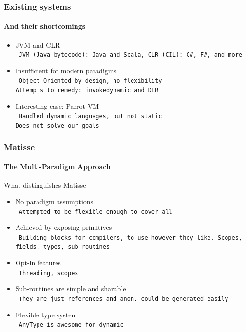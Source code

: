 \documentclass[handout]{beamer}
\newcommand{\n}[1]{\leavevmode\\~\texttt{\color{red}\tiny #1}}
\begin{document}
\begin{frame}
  \frametitle{Existing systems}
  \framesubtitle{And their shortcomings}

  \begin{itemize}
  \item JVM and CLR
    \n{JVM (Java bytecode): Java and Scala, CLR (CIL): C\#, F\#, and more}
  \item Insufficient for modern paradigms
    \n{Object-Oriented by design, no flexibility\\
       Attempts to remedy: {\tt invokedynamic} and DLR
    }
  \item Interesting case: Parrot VM
    \n{Handled dynamic languages, but not static\\
       Does not solve our goals
     }
  \end{itemize}
\end{frame}

\begin{frame}
  \frametitle{Matisse}
  \framesubtitle{The Multi-Paradigm Approach}

  What distinguishes Matisse
  \begin{itemize}
  \item No paradigm assumptions
    \n{Attempted to be flexible enough to cover all}
  \item Achieved by exposing primitives
    \n{Building blocks for compilers, to use however they like. Scopes, fields, types, sub-routines}
  \item Opt-in features
    \n{Threading, scopes}
  \item Sub-routines are simple and sharable
    \n{They are just references and anon. could be generated easily}
  \item Flexible type system
    \n{AnyType is awesome for dynamic}
  \end{itemize}
\end{frame}
\end{document}
